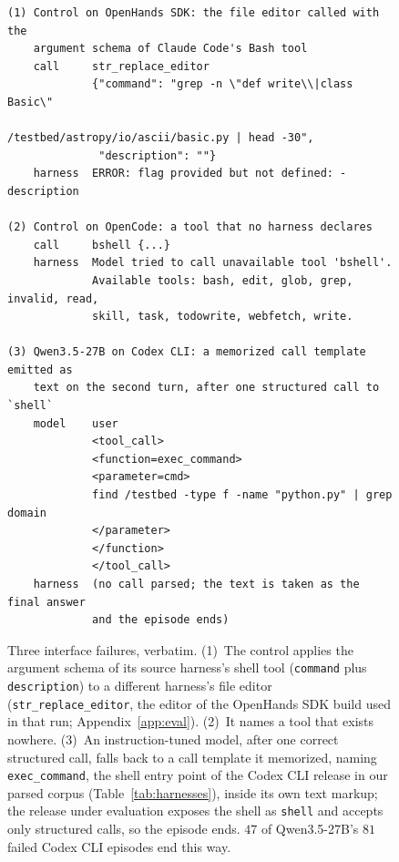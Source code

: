 \documentclass{article} %
\newcommand{\codexcli}{Codex CLI}
\newcommand{\openhands}{OpenHands SDK}   %
\begin{document}
\begin{figure}[t]
\begin{footnotesize}
\begin{verbatim}
(1) Control on OpenHands SDK: the file editor called with the
    argument schema of Claude Code's Bash tool
    call     str_replace_editor
             {"command": "grep -n \"def write\\|class Basic\"
                          /testbed/astropy/io/ascii/basic.py | head -30",
              "description": ""}
    harness  ERROR: flag provided but not defined: -description

(2) Control on OpenCode: a tool that no harness declares
    call     bshell {...}
    harness  Model tried to call unavailable tool 'bshell'.
             Available tools: bash, edit, glob, grep, invalid, read,
             skill, task, todowrite, webfetch, write.

(3) Qwen3.5-27B on Codex CLI: a memorized call template emitted as
    text on the second turn, after one structured call to `shell`
    model    user
             <tool_call>
             <function=exec_command>
             <parameter=cmd>
             find /testbed -type f -name "python.py" | grep domain
             </parameter>
             </function>
             </tool_call>
    harness  (no call parsed; the text is taken as the final answer
             and the episode ends)
\end{verbatim}
\end{footnotesize}
\caption{Three interface failures, verbatim. (1)~The control applies the
argument schema of its source harness's shell tool (\texttt{command} plus
\texttt{description}) to a different harness's file editor
(\texttt{str\_replace\_editor}, the editor of the \openhands{} build used in
that run; Appendix~\ref{app:eval}). (2)~It names a tool that exists nowhere. (3)~An instruction-tuned model, after one correct
structured call, falls back to a call template it memorized, naming
\texttt{exec\_command}, the shell entry point of the \codexcli{} release in
our parsed corpus (Table~\ref{tab:harnesses}), inside its own text markup;
the release under evaluation exposes the shell as \texttt{shell} and accepts
only structured calls, so the episode ends. $47$ of Qwen3.5-27B's $81$ failed
\codexcli{} episodes end this way.}
\label{fig:ana-examples}
\end{figure}
\end{document}
